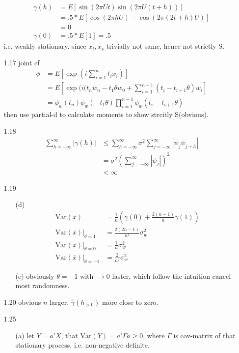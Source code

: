 \documentclass[paper=a4, fontsize=11pt]{scrartcl} %
\numberwithin{equation}{section} %
\numberwithin{figure}{section} %
\numberwithin{table}{section} %
\def \var {\text{Var}}
\begin{document}
\begin{itemize}
	\begin{align}
		\gamma(h) &= E[\sin(2\pi Ut)\sin(2\pi U(t+h))]\\
			&= .5*E[\cos(2\pi hU) - \cos(2\pi(2t+h)U)]\\
			&= 0\\
		\gamma(0) &= .5*E[1]=.5
	\end{align}
	i.e. weakly stationary. since $x_t,x_s$ trivially not same, hence not strictly S.
	\item[1.17] joint cf
	\begin{align}
		\phi &= E[\exp(i\sum_{i=1}^n t_i x_i)]\\
			&= E[\exp(i(t_n w_n-t_1\theta w_0+\sum_{i=1}^{n-1}(t_i-t_{i+1}\theta)w_i]\\
			&= \phi_w(t_n)\phi_w(-t_1\theta)\prod_{i=1}^{n-1}\phi_w(t_i-t_{i+1}\theta)
	\end{align}
	then use partial-d to calculate moments to show strcitly S(obvious).
	\item[1.18]
	\begin{align}
		\sum_{h=-\infty}^\infty |\gamma(h)| &\leq \sum_{h=-\infty}^\infty \sigma^2 \sum_{j=-\infty}^\infty |\psi_j\psi_{j+h}|\\
			&= \sigma^2 (\sum_{j=-\infty}^\infty |\psi_j|)^2\\
			&< \infty
	\end{align}
	\item[1.19]
	\begin{itemize}
		\item[(d)]
		\begin{align}
			\var(\overline{x}) &= \frac{1}{n}(\gamma(0)+\frac{2(n-1)}{n}\gamma(1))\\
			\var(\overline{x})|_{\theta=1} &= \frac{2(2n-1)}{n^2}\sigma_w^2\\
			\var(\overline{x})|_{\theta=0} &= \frac{1}{n}\sigma_w^2\\
			\var(\overline{x})|_{\theta=-1} &= \frac{2}{n^2}\sigma_w^2
		\end{align}
		\item[(e)] obviously $\theta=-1$ with $\rightarrow 0$ faster, which follow the intuition cancel most randomness.
	\end{itemize}
	\item[1.20] obvious $n$ larger, $\hat{\gamma}(h_{>0})$ more close to zero.
	\item[1.25]
	\begin{itemize}
		\item[(a)] let $Y=a'X$, that $\var(Y)= a'\Gamma a\geq 0$, where $\Gamma$ is cov-matrix of that stationary process. i.e. non-negative definite.

\end{itemize}
\end{itemize}
\end{document}
